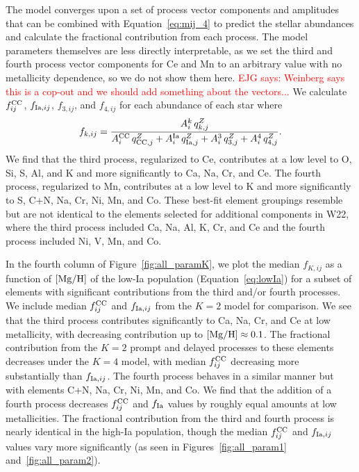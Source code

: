 \documentclass[modern]{aastex631}
\newcommand{\mgh}{[{\rm Mg}/{\rm H}]}
\newcommand{\qcc}{q_{{\rm CC,}j}^{Z}}
\newcommand{\qIa}{q_{{\rm Ia,}j}^{Z}}
\newcommand{\Acc}{A^{\rm CC}_{i}}
\newcommand{\AIa}{A^{\rm Ia}_{i}}
\newcommand{\fcc}{f_{ij}^{\rm CC}}
\newcommand{\ejg}[1]{\textcolor{red}{EJG says: #1}}
\begin{document}
The model converges upon a set of process vector components and amplitudes that can be combined with Equation~\ref{eq:mij_4} to predict the stellar abundances and calculate the fractional contribution from each process. The model parameters themselves are less directly interpretable, as we set the third and fourth process vector components for Ce and Mn to an arbitrary value with no metallicity dependence, so we do not show them here. \ejg{Weinberg says this is a cop-out and we should add something about the vectors...} We calculate $\fcc$, $f_{{\rm Ia}, ij}$, $f_{3, ij}$, and $f_{4, ij}$ for each abundance of each star where
\begin{equation}\label{eq:fX}
    f_{k, ij} = \frac{A_{i}^{k} \, q_{k,j}^Z}{\Acc\,\qcc + \AIa\,\qIa + A_{i}^{3}\,q_{3, j}^{Z} + A_{i}^{4}\,q_{4, j}^{Z}}.
\end{equation}
We find that the third process, regularized to Ce, contributes at a low level to O, Si, S, Al, and K and more significantly to Ca, Na, Cr, and Ce. The fourth process, regularized to Mn, contributes at a low level to K and more significantly to S, C+N, Na, Cr, Ni, Mn, and Co. These best-fit element groupings resemble but are not identical to the elements selected for additional components in W22, where the third process included Ca, Na, Al, K, Cr, and Ce and the fourth process included Ni, V, Mn, and Co. 

In the fourth column of Figure~\ref{fig:all_paramK}, we plot the median $f_{K, ij}$ as a function of $\mgh$ of the low-Ia population (Equation~\ref{eq:lowIa}) for a subset of elements with significant contributions from the third and/or fourth processes. We include median $\fcc$ and $f_{{\rm Ia},ij}$ from the $K=2$ model for comparison. We see that the third process contributes significantly to Ca, Na, Cr, and Ce at low metallicity, with decreasing contribution up to $\mgh\approx0.1$. The fractional contribution from the $K=2$ prompt and delayed processes to these elements decreases under the $K=4$ model, with median $\fcc$ decreasing more substantially than $f_{{\rm Ia}, ij}$. The fourth process behaves in a similar manner but with elements C+N, Na, Cr, Ni, Mn, and Co. We find that the addition of a fourth process decreases $\fcc$ and $f_{\rm Ia}$ values by roughly equal amounts at low metallicities. The fractional contribution from the third and fourth process is nearly identical in the high-Ia population, though the median $\fcc$ and $f_{{\rm Ia}, ij}$ values vary more significantly (as seen in Figures~\ref{fig:all_param1} and~\ref{fig:all_param2}).
\end{document}
